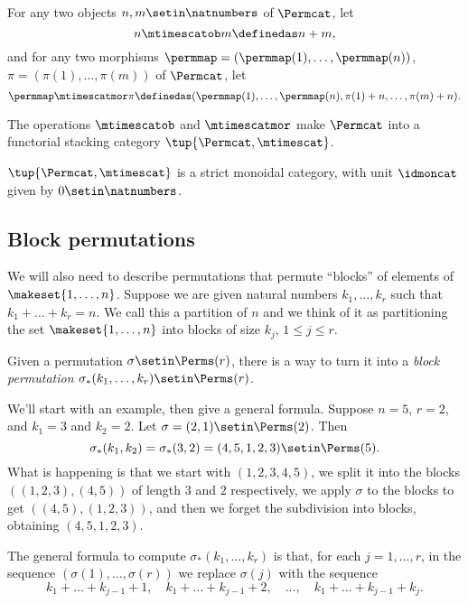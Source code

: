 \begin{definition}\label{def:Permcat-1}
    For any two objects $n, m \setin\natnumbers$ of $\Permcat$, let
    \begin{equation}
        n \mtimescatob m \definedas n + m,
    \end{equation}
    and for any two morphisms $\permmap = (\permmap(1), \dots, \permmap(n))$, $\pi = (\pi(1), \dots, \pi(m))$ of $\Permcat$, let
    \begin{equation}
        \permmap \mtimescatmor \pi \definedas (\permmap(1), \dots, \permmap(n), \pi(1) + n, \dots, \pi(m) + n).
    \end{equation}
\end{definition}

\begin{lemma}
    The operations $\mtimescatob$ and $\mtimescatmor$ make $\Permcat$ into a functorial stacking category $\tup{\Permcat, \mtimescat}$.
\end{lemma}


\begin{lemma}
    $\tup{\Permcat, \mtimescat}$ is a strict monoidal category, with unit $\idmoncat$ given by $0 \setin \natnumbers$.
\end{lemma}


\subsection{Block permutations}

We will also need to describe permutations that permute ``blocks'' of elements of $\makeset{1, \dots, n}$.
Suppose we are given natural numbers $k_1, \dots, k_r$ such that $k_1 + \dots + k_r = n$.
We call this a partition of $n$ and we think of it as partitioning the set $\makeset{1, \dots, n}$ into blocks of size $k_j$, $1 \leq j \leq r$.

Given a permutation $\sigma \setin \Perms(r)$, there is a way to turn it into a \emph{block permutation} $\sigma_*(k_1, \dots, k_r) \setin\Perms(r)$.

We'll start with an example, then give a general formula.
Suppose $n = 5$, $r=2$, and $k_1 = 3$ and $k_2 = 2$.
Let $\sigma = (2, 1) \setin \Perms(2)$.
Then
$$
    \sigma_*(k_1, k_2) = \sigma_*(3,2) = (4,5,1,2,3) \setin \Perms(5).
$$
What is happening is that we start with $(1,2,3,4,5)$, we split it into the blocks $((1,2,3),(4,5))$ of length $3$ and $2$ respectively, we apply $\sigma$ to the blocks to get $((4,5),(1,2,3))$, and then we forget the subdivision into blocks, obtaining $(4,5,1,2,3)$.

The general formula to compute $\sigma_*(k_1,\dots, k_r)$ is that, for each $j = 1, \dots, r$, in the sequence $(\sigma(1), \dots, \sigma(r))$ we replace $\sigma(j)$ with the sequence
$$
    k_1 + \dots + k_{j-1} + 1, \quad k_1 + \dots + k_{j-1} + 2, \quad \dots, \quad k_1 + \dots + k_{j-1} + k_j.
$$

